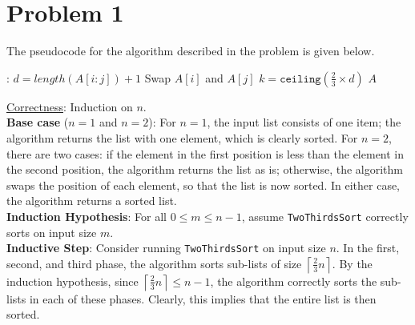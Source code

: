 \documentclass[twoside,11pt]{homework}
\date{\today}
\newcommand\NoProc{\renewcommand\algorithmicprocedure{}}
\begin{document}
\maketitle

\section*{Problem 1}
The pseudocode for the algorithm described in the problem is given below.
\begin{algorithm}
\begin{algorithmic}[1]
\NoProc
{}:  
\State $d = length(A[i:j])+1$     
\State Swap $A[i]$ and $A[j]$     
\EndIf
{}
\State $k = \texttt{ceiling}(\frac{2}{3}\times d)$   
\State {}  
\State {}  
\State {}  
\EndIf
\State \Return $A$
\EndProcedure 
\end{algorithmic}
\end{algorithm}

\noindent
\underline{Correctness}:  Induction on $n$.  \\[0.2em]
\noindent
\textbf{Base case} ($n = 1$ and $n=2$):  For $n=1$, the input list consists of one item; the algorithm returns the list with one element, which is clearly sorted.  For $n=2$, there are two cases: if the element in the first position is less than the element in the second position, the algorithm returns the list as is; otherwise, the algorithm swaps the position of each element, so that the list is now sorted.  In either case, the algorithm returns a sorted list. \\[0.4em]
\textbf{Induction Hypothesis}: For all $0\leq m \leq n-1$, assume \texttt{TwoThirdsSort} correctly sorts on input size $m$.  \\[0.4em]
\textbf{Inductive Step}:  Consider running \texttt{TwoThirdsSort} on input size $n$.  In the first, second, and third phase, the algorithm sorts sub-lists of size $\left\lceil\frac{2}{3}n\right\rceil$. By the induction hypothesis,  since $\left\lceil\frac{2}{3}n\right\rceil \leq n-1$, the algorithm correctly sorts the sub-lists in each of these phases.  Clearly, this implies that the entire list is then sorted.  \\
\end{document}
